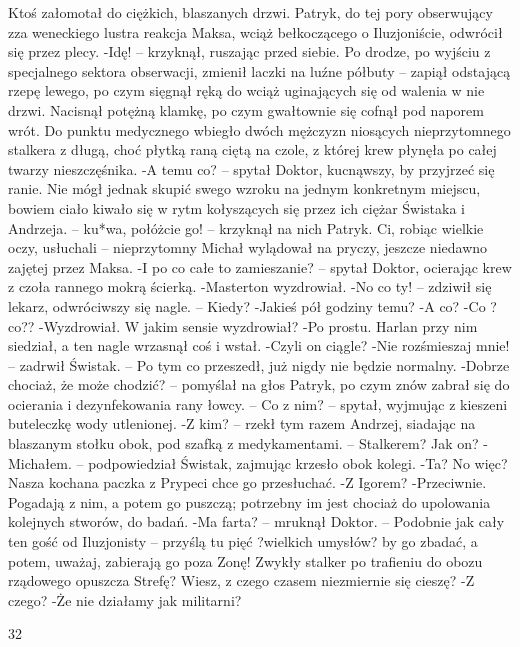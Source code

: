 \documentclass[../MAIN.tex]{subfiles}
\begin{document}
Ktoś załomotał do ciężkich, blaszanych drzwi. Patryk, do tej pory obserwujący zza weneckiego lustra reakcja Maksa, wciąż bełkoczącego o Iluzjoniście, odwrócił się przez plecy.
-Idę! -- krzyknął, ruszając przed siebie. Po drodze, po wyjściu z specjalnego sektora obserwacji, zmienił laczki na luźne półbuty -- zapiął odstającą rzepę lewego, po czym sięgnął ręką do wciąż uginających się od walenia w nie drzwi. Nacisnął potężną klamkę, po czym gwałtownie się cofnął pod naporem wrót.
Do punktu medycznego wbiegło dwóch mężczyzn niosących nieprzytomnego stalkera z długą, choć płytką raną ciętą na czole, z której krew płynęła po całej twarzy nieszczęśnika.
-A temu co? -- spytał Doktor, kucnąwszy, by przyjrzeć się ranie. Nie mógł jednak skupić swego wzroku na jednym konkretnym miejscu, bowiem ciało kiwało się w rytm kołyszących się przez ich ciężar Świstaka i Andrzeja. -- ku*wa, połóżcie go! -- krzyknął na nich Patryk. Ci, robiąc wielkie oczy, usłuchali -- nieprzytomny Michał wylądował na pryczy, jeszcze niedawno zajętej przez Maksa.
-I po co całe to zamieszanie? -- spytał Doktor, ocierając krew z czoła rannego mokrą ścierką.
-Masterton wyzdrowiał.
-No co ty! -- zdziwił się lekarz, odwróciwszy się nagle. -- Kiedy?
-Jakieś pół godziny temu?
-A co?
-Co ?co??
-Wyzdrowiał. W jakim sensie wyzdrowiał?
-Po prostu. Harlan przy nim siedział, a ten nagle wrzasnął coś i wstał.
-Czyli on ciągle?
-Nie rozśmieszaj mnie! -- zadrwił Świstak. -- Po tym co przeszedł, już nigdy nie będzie normalny.
-Dobrze chociaż, że może chodzić? -- pomyślał na głos Patryk, po czym znów zabrał się do ocierania i dezynfekowania rany łowcy. -- Co z nim? -- spytał, wyjmując z kieszeni buteleczkę wody utlenionej.
-Z kim? -- rzekł tym razem Andrzej, siadając na blaszanym stołku obok, pod szafką z medykamentami. -- Stalkerem? Jak on?
-Michałem. -- podpowiedział Świstak, zajmując krzesło obok kolegi.
-Ta? No więc? Nasza kochana paczka z Prypeci chce go przesłuchać.
-Z Igorem?
-Przeciwnie. Pogadają z nim, a potem go puszczą; potrzebny im jest chociaż do upolowania kolejnych stworów, do badań.
-Ma farta? -- mruknął Doktor. -- Podobnie jak cały ten gość od Iluzjonisty -- przyślą tu pięć ?wielkich umysłów? by go zbadać, a potem, uważaj, zabierają go poza Zonę! Zwykły stalker po trafieniu do obozu rządowego opuszcza Strefę? Wiesz, z czego czasem niezmiernie się cieszę?
-Z czego?
-Że nie działamy jak militarni?

32
\end{document}
